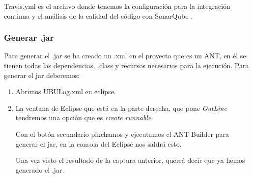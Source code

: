 Travis.yml es el archivo donde tenemos la configuración para la integración continua y el análisis de la calidad del código con SonarQube \cite{web:travis,web:sonarqube}.

\subsubsection{Generar .jar}\label{generar-jar}

Para generar el .jar se ha creado un .xml en el proyecto que es un ANT, en él se tienen todas las dependencias, .class y recursos necesarios para la ejecución. Para generar el jar deberemos:

\begin{enumerate}
	\tightlist
	\item
	Abrimos UBULog.xml en eclipse.
	\item
	La ventana de Eclipse que está en la parte derecha, que pone \emph{OutLine} tendremos una opción que es \emph{create runnable}.
	
	
	Con el botón secundario pinchamos y ejecutamos el ANT Builder para generar el jar, en la consola del Eclipse nos saldrá esto.
	
	
	Una vez visto el resultado de la captura anterior, querrá decir que ya hemos generado el .jar.
	
\end{enumerate}

